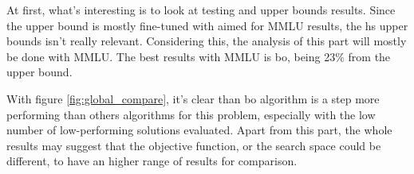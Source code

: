 At first, what's interesting is to look at testing and upper bounds results. Since the upper bound is mostly fine-tuned with aimed for MMLU results, the \Gls{hs} upper bounds isn't really relevant. Considering this, the analysis of this part will mostly be done with MMLU. The best results with MMLU is \acrfull{bo}, being 23\% from the upper bound.




With figure \ref{fig:global_compare}, it's clear than \acrshort{bo} algorithm is a step more performing than others algorithms for this problem, especially with the low number of low-performing solutions evaluated. Apart from this part, the whole results may suggest that the objective function, or the search space could be different, to have an higher range of results for comparison. 










